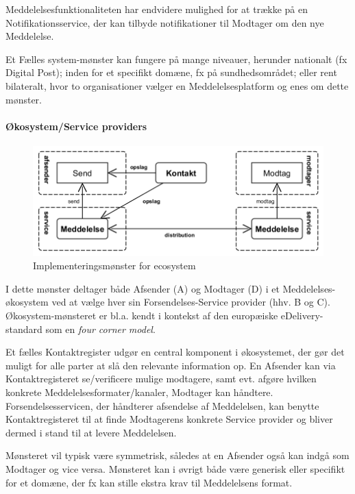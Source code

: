 Meddelelsesfunktionaliteten har endvidere mulighed for at trække på en
Notifikationsservice, der kan tilbyde notifikationer til Modtager om den
nye Meddelelse.

Et Fælles system-mønster kan fungere på mange niveauer, herunder
nationalt (fx Digital Post); inden for et specifikt domæne, fx på
sundhedsområdet; eller rent bilateralt, hvor to organisationer vælger en
Meddelelsesplatform og enes om dette mønster.

\paragraph{Økosystem/Service
providers}\label{uxf8kosystemservice-providers}

\begin{figure}
\centering
\includegraphics[width=\textwidth]{figures/send-eco.png}
\caption{Implementeringsmønster for ecosystem}
\end{figure}

I dette mønster deltager både Afsender (A) og Modtager (D) i et
Meddelelses-økosystem ved at vælge hver sin Forsendelses-Service
provider (hhv. B og C). Økosystem-mønsteret er bl.a. kendt i kontekst af
den europæiske eDelivery-standard som en \emph{four corner model}.

Et fælles Kontaktregister udgør en central komponent i økosystemet, der
gør det muligt for alle parter at slå den relevante information op. En
Afsender kan via Kontaktregisteret se/verificere mulige modtagere, samt
evt. afgøre hvilken konkrete Meddelelsesformater/kanaler, Modtager kan
håndtere. Forsendelsesservicen, der håndterer afsendelse af Meddelelsen,
kan benytte Kontaktregisteret til at finde Modtagerens konkrete Service
provider og bliver dermed i stand til at levere Meddelelsen.

Mønsteret vil typisk være symmetrisk, således at en Afsender også kan
indgå som Modtager og vice versa. Mønsteret kan i øvrigt både være
generisk eller specifikt for et domæne, der fx kan stille ekstra krav
til Meddelelsens format.

